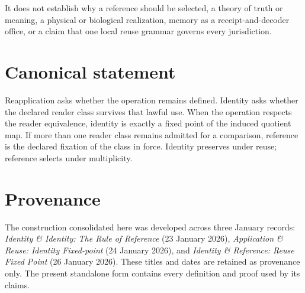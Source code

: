 \documentclass[11pt]{article}
\begin{document}
It does not establish why a reference should be selected, a theory of truth or meaning, a physical or biological realization, memory as a receipt-and-decoder office, or a claim that one local reuse grammar governs every jurisdiction.

\section{Canonical statement}

\begin{lawbox}
Reapplication asks whether the operation remains defined. Identity asks whether the declared reader class survives that lawful use. When the operation respects the reader equivalence, identity is exactly a fixed point of the induced quotient map. If more than one reader class remains admitted for a comparison, reference is the declared fixation of the class in force. Identity preserves under reuse; reference selects under multiplicity.
\end{lawbox}

\section*{Provenance}

The construction consolidated here was developed across three January records: \emph{Identity \& Identity: The Rule of Reference} (23 January 2026), \emph{Application \& Reuse: Identity Fixed-point} (24 January 2026), and \emph{Identity \& Reference: Reuse Fixed Point} (26 January 2026). These titles and dates are retained as provenance only. The present standalone form contains every definition and proof used by its claims.
\end{document}
